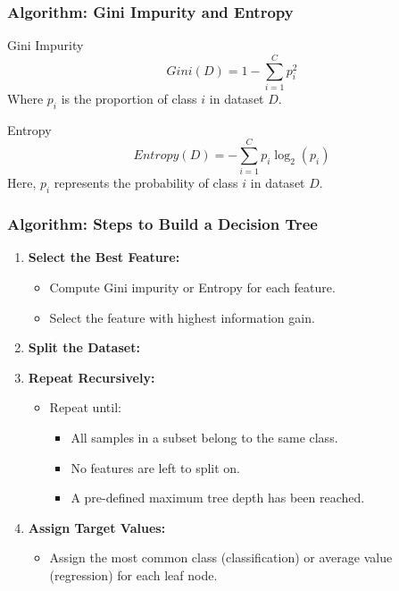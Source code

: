 \documentclass[aspectratio=169]{beamer}
\begin{document}
\begin{frame}[fragile]
    \frametitle{Algorithm: Gini Impurity and Entropy}
    \begin{block}{Gini Impurity}
        \begin{equation}
            Gini(D) = 1 - \sum_{i=1}^{C} p_i^2
        \end{equation}
        Where \(p_i\) is the proportion of class \(i\) in dataset \(D\).
    \end{block}
    
    \begin{block}{Entropy}
        \begin{equation}
            Entropy(D) = -\sum_{i=1}^{C} p_i \log_2(p_i)
        \end{equation}
        Here, \(p_i\) represents the probability of class \(i\) in dataset \(D\).
    \end{block}
\end{frame}

\begin{frame}[fragile]
    \frametitle{Algorithm: Steps to Build a Decision Tree}
    \begin{enumerate}
        \item \textbf{Select the Best Feature:}
        \begin{itemize}
            \item Compute Gini impurity or Entropy for each feature.
            \item Select the feature with highest information gain.
        \end{itemize}
        \item \textbf{Split the Dataset:}
        \item \textbf{Repeat Recursively:}
        \begin{itemize}
            \item Repeat until:
            \begin{itemize}
                \item All samples in a subset belong to the same class.
                \item No features are left to split on.
                \item A pre-defined maximum tree depth has been reached.
            \end{itemize}
        \end{itemize}
        \item \textbf{Assign Target Values:}
        \begin{itemize}
            \item Assign the most common class (classification) or average value (regression) for each leaf node.
        \end{itemize}
    \end{enumerate}
\end{frame}
\end{document}
